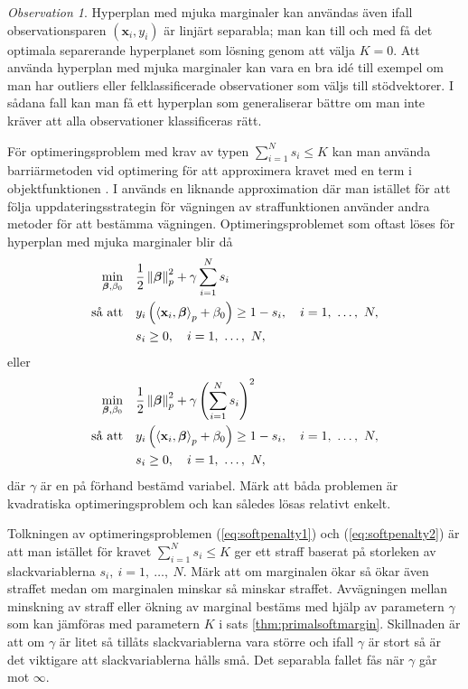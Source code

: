 \documentclass[a4paper, 12pt]{report}
\theoremstyle{definition}
\theoremstyle{remark}
\newtheorem*{rem}{Observation}
\newcommand{\bfbeta}{{\boldsymbol{\beta}}}
\newcommand{\bfx}{\mathbf{x}}
\newcommand{\llangle}{\left\langle}
\newcommand{\rrangle}{\right\rangle}
\newcommand{\inner}[2]{\llangle #1, #2 \rrangle}
\begin{document}
\begin{rem}
	Hyperplan med mjuka marginaler kan användas även ifall observationsparen $\left(\mathbf{x}_i, y_i\right)$ är linjärt separabla; man kan till och med få det optimala separerande hyperplanet som lösning genom att välja $K=0$. Att använda hyperplan med mjuka marginaler kan vara en bra idé till exempel om man har outliers eller felklassificerade observationer som väljs till stödvektorer. I sådana fall kan man få ett hyperplan som generaliserar bättre om man inte kräver att alla observationer klassificeras rätt.
\end{rem}

För optimeringsproblem med krav av typen $\sum_{i=1}^{N}s_i\leq K$ kan man använda barriärmetoden vid optimering för att approximera kravet med en term i objektfunktionen \cite{Boyd}. I \cite{CortesVapnik} används en liknande approximation där man istället för att följa uppdateringsstrategin för vägningen av straffunktionen använder andra metoder för att bestämma vägningen. Optimeringsproblemet som oftast löses för hyperplan med mjuka marginaler blir då
\begin{equation}\label{eq:softpenalty1}
\begin{aligned}
	\operatornamewithlimits{min}_{\bfbeta, \beta_0} & & &\frac{1}{2}\left\|\bfbeta
\right\|_p^2 + \gamma\sum_{i=1}^{N} s_i\\
	\text{så att} & & &y_i\left(\inner{\bfx_i}{\bfbeta}_p+\beta_0\right)\geq 1 - s_i,\quad i=1,~\dots,~N,\\
	& & &s_i\geq0,\quad i=1,~\dots,~N,
\end{aligned}
\end{equation}
eller
\begin{equation}\label{eq:softpenalty2}
\begin{aligned}
\operatornamewithlimits{min}_{\bfbeta, \beta_0} & & &\frac{1}{2}\left\|\bfbeta
\right\|_p^2 + \gamma\left(\sum_{i=1}^{N} s_i\right)^2\\
\text{så att} & & &y_i\left(\inner{\bfx_i}{\bfbeta}_p+\beta_0\right)\geq 1 - s_i,\quad i=1,~\dots,~N,\\
& & &s_i\geq0,\quad i=1,~\dots,~N,
\end{aligned}
\end{equation}
där $\gamma$ är en på förhand bestämd variabel.
Märk att båda problemen är kvadratiska optimeringsproblem och kan således lösas relativt enkelt.

Tolkningen av optimeringsproblemen (\ref{eq:softpenalty1}) och (\ref{eq:softpenalty2}) är att man istället för kravet $\sum_{i=1}^{N}s_i\leq K$ ger ett straff baserat på storleken av slackvariablerna $s_i,~i=1,~\dots,~N$. Märk att om marginalen ökar så ökar även straffet medan om marginalen minskar så minskar straffet. Avvägningen mellan minskning av straff eller ökning av marginal bestäms med hjälp av parametern $\gamma$ som kan jämföras med parametern $K$ i sats \ref{thm:primalsoftmargin}. Skillnaden är att om $\gamma$ är litet så tillåts slackvariablerna vara större och ifall $\gamma$ är stort så är det viktigare att slackvariablerna hålls små. Det separabla fallet fås när $\gamma$ går mot $\infty$.
\end{document}
